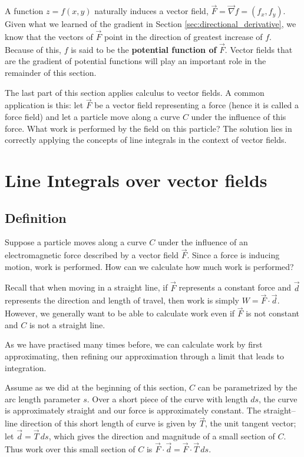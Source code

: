 A function $z=f(x,y)$ naturally induces a vector field, $\vec F = \vec{\nabla} f = \left( f_x,f_y\right)$. Given what we learned of the gradient in Section \ref{sec:directional_derivative}, we know that the vectors of $\vec F$ point in the direction of greatest increase of $f$. Because of this, $f$ is said to be the \textbf{potential function of} $\vec F$. Vector fields that are the gradient of potential functions will play an important role in the remainder of this  section.

The last part of this section applies calculus to vector fields. A common application is this: let $\vec F$ be a vector field representing a force (hence it is called a force field) and let a particle move along a curve $C$ under the influence of this force. What work is performed by the field on this particle? The solution lies in correctly applying the concepts of line integrals in the context of vector fields.


\section{Line Integrals over vector fields}\label{sec:line_int_vf}
\subsection{Definition}
Suppose a particle moves along a curve $C$ under the influence of an electromagnetic force described by a vector field $\vec F$. Since a force is inducing motion, work is performed. How can we calculate how much work is performed?

Recall that when moving in a straight line, if $\vec F$ represents a constant force and $\vec d$ represents the direction and length of travel, then work is simply $W = \vec F\cdot \vec d$. However, we generally want to be able to calculate work even if $\vec F$ is not constant and $C$ is not a straight line.

As we have practised many times before, we can calculate work by first approximating, then refining our approximation through a limit that leads to integration. 

Assume as we did at the beginning of this section, $C$ can be parametrized by the arc length parameter $s$. Over a short piece of the curve with length $ds$, the curve is approximately straight and our force is approximately constant. The straight--line direction of this short length of curve is given by $\vec T$, the unit tangent vector;   let $\vec d = \vec T\,ds$, which gives  the direction and magnitude of a small section of $C$. Thus work over this small section of $C$ is $\vec F \cdot \vec d = \vec F\cdot \vec T\, ds$. 


